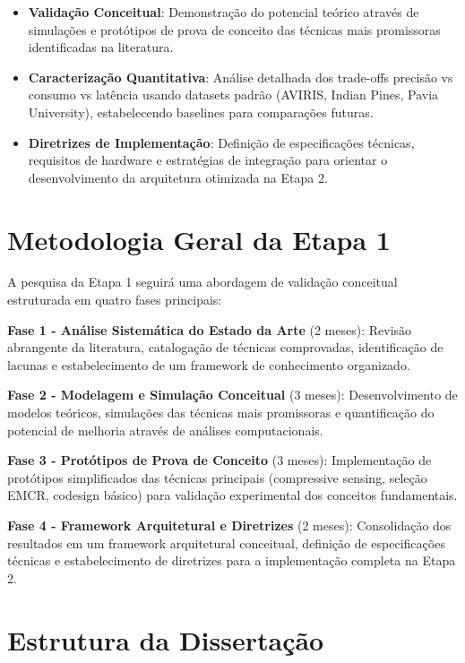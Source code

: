 \begin{itemize}
\item \textbf{Validação Conceitual}: Demonstração do potencial teórico através de simulações e protótipos de prova de conceito das técnicas mais promissoras identificadas na literatura.

\item \textbf{Caracterização Quantitativa}: Análise detalhada dos trade-offs precisão vs consumo vs latência usando datasets padrão (AVIRIS, Indian Pines, Pavia University), estabelecendo baselines para comparações futuras.

\item \textbf{Diretrizes de Implementação}: Definição de especificações técnicas, requisitos de hardware e estratégias de integração para orientar o desenvolvimento da arquitetura otimizada na Etapa 2.
\end{itemize}

\section{Metodologia Geral da Etapa 1}

A pesquisa da Etapa 1 seguirá uma abordagem de validação conceitual estruturada em quatro fases principais:

\textbf{Fase 1 - Análise Sistemática do Estado da Arte} (2 meses): Revisão abrangente da literatura, catalogação de técnicas comprovadas, identificação de lacunas e estabelecimento de um framework de conhecimento organizado.

\textbf{Fase 2 - Modelagem e Simulação Conceitual} (3 meses): Desenvolvimento de modelos teóricos, simulações das técnicas mais promissoras e quantificação do potencial de melhoria através de análises computacionais.

\textbf{Fase 3 - Protótipos de Prova de Conceito} (3 meses): Implementação de protótipos simplificados das técnicas principais (compressive sensing, seleção EMCR, codesign básico) para validação experimental dos conceitos fundamentais.

\textbf{Fase 4 - Framework Arquitetural e Diretrizes} (2 meses): Consolidação dos resultados em um framework arquitetural conceitual, definição de especificações técnicas e estabelecimento de diretrizes para a implementação completa na Etapa 2.

\section{Estrutura da Dissertação}

